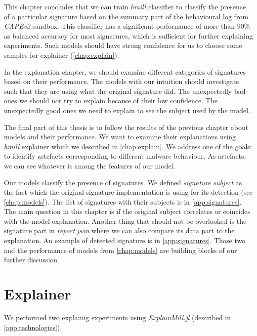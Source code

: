 This chapter concludes that we can train \emph{hmill} classifier to classify the presence of a particular signature based on the summary part of the behavioural log from \emph{CAPEv2} sandbox. This classifier has a significant performance of more than $90\%$ as balanced accuracy for most signatures, which is sufficient for further explaining experiments. Such models should have strong confidence for us to choose some samples for explainer (\ref{chap:explain}). 


In the explanation chapter, we should examine different categories of signatures based on their performance. The models with our intuition should investigate such that they are using what the original signature did. The unexpectedly bad ones we should not try to explain because of their low confidence. The unexpectedly good ones we need to explain to see the subject used by the model.



The final part of this thesis is to follow the results of the previous chapter about models and their performance. We want to examine their explanations using \emph{hmill} explainer \cite{Pevny2020} which we described in \ref{chap:explain}. We address one of the goals: to identify artefacts corresponding to different malware behaviour. As artefacts, we can see whatever is among the features of our model. 

Our models classify the presence of signatures. We defined \emph{signature subject} as the fact which the original signature implementation is using for its detection (see \ref{chap:models}). The list of signatures with their subjects is in \ref{app:signatures}. The main question in this chapter is if the original subject correlates or coincides with the model explanation. Another thing that should not be overlooked is the signature part in \emph{report.json} where we can also compare its data part to the explanation. An example of detected signature is in \ref{app:signatures}. Those two and the performance of models from \ref{chap:models} are building blocks of our further discussion.

\section{Explainer}
We performed two explainig experiments using \emph{ExplainMill.jl} (described in \ref{app:technologies}). 

